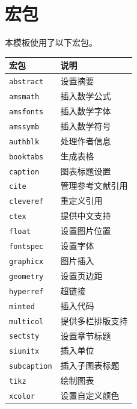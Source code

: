 \documentclass[a4paper]{article}
\begin{document}
\section{宏包}

本模板使用了以下宏包。

\begin{center}
    \begin{tabular}{|m{}|m{}|}
        \hline
        宏包 & 说明 \\
        \hline
        \texttt{abstract} & 设置摘要 \\
        \texttt{amsmath} & 插入数学公式 \\
        \texttt{amsfonts} & 插入数学字体 \\
        \texttt{amssymb} & 插入数学符号 \\
        \texttt{authblk} & 处理作者信息 \\
        \texttt{booktabs} & 生成表格 \\
        \texttt{caption} & 图表标题设置 \\
        \texttt{cite} & 管理参考文献引用 \\
        \texttt{cleveref} & 重定义引用 \\
        \texttt{ctex} & 提供中文支持 \\
        \texttt{float} & 设置图片位置 \\
        \texttt{fontspec} & 设置字体 \\
        \texttt{graphicx} & 图片插入 \\
        \texttt{geometry} & 设置页边距 \\
        \texttt{hyperref} & 超链接 \\
        \texttt{minted} & 插入代码 \\
        \texttt{multicol} & 提供多栏排版支持 \\
        \texttt{sectsty} & 设置章节标题 \\
        \texttt{siunitx} & 插入单位 \\
        \texttt{subcaption} & 插入子图表标题 \\
        \texttt{tikz} & 绘制图表 \\
        \texttt{xcolor} & 设置自定义颜色 \\
        \hline
    \end{tabular}
\end{center}
\end{document}
